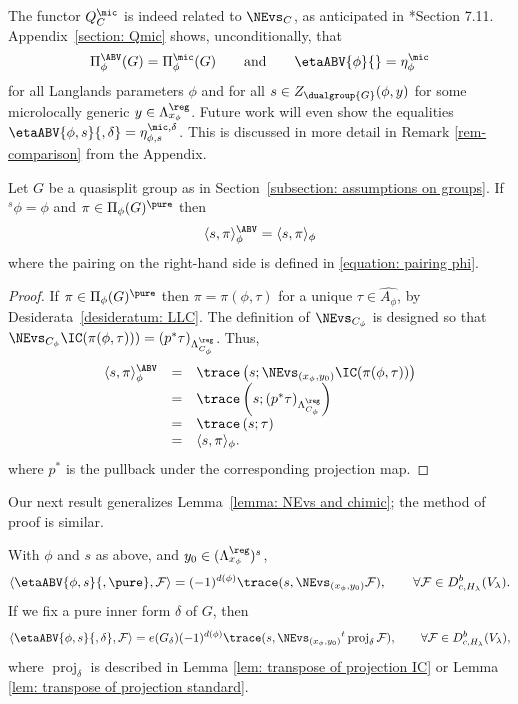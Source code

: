 \documentclass[11pt,letterpaper]{amsart}
\numberwithin{equation}{section}
\begin{document}
\begin{remark}\label{remark: trilinguality}
The functor $Q^\mic_C$ is indeed related to $\NEvs_C$, as anticipated in 
\cite{CFMMX22}*{Section 7.11}.
Appendix~\ref{section: Qmic} shows, unconditionally, that 
\[
\Pi^\ABV_\phi(G)
=
\Pi^\mic_\phi(G)
\qquad\textrm{and}\qquad
\etaABV{\phi}{}
=
\eta^\mic_{\phi}
\]
for all Langlands parameters $\phi$ and for all $s\in Z_{\dualgroup{G}}(\phi,y)$ for some microlocally generic $y\in \Lambda_{x_\phi}^\reg$.
Future work will even show the equalities $\etaABV{\phi,s}{,\delta} = \eta^{\mic,\delta}_{\phi,s}$.
This is discussed in more detail in Remark 
\ref{rem-comparison} from the Appendix.
\end{remark}



\begin{proposition}\label{prop L-packet inside ABV packet}
Let $G$ be a quasisplit group as in Section~\ref{subsection: assumptions on groups}.
    If  ${}^{s}\phi=\phi$ and $\pi \in \Pi_{\phi}(G)^\pure$ then 
    \[
    \langle {s},\pi\rangle_{\phi}^{\ABV} 
    = 
    \langle {s},\pi\rangle_{\phi}
    \]
    where the pairing on the right-hand side is defined in \eqref{equation: pairing phi}.
\end{proposition}

\begin{proof}
If $\pi \in \Pi_\phi(G)^\pure$ then $\pi=\pi(\phi,\tau)$ for a unique $\tau \in \widehat{A_\phi}$, by Desiderata~\ref{desideratum: LLC}.
The definition of $\NEvs_{C_\phi}$ is designed so that $\NEvs_{C_\phi} \IC(\pi(\phi,\tau))) = (p^*\tau)_{\Lambda^\reg_{C_\phi}}$.
Thus,
\[
\begin{array}{rcl}
\langle {s},\pi\rangle_{\phi}^{\ABV}
&=&
\trace\left({s}; \NEvs_{(x_\phi,y_0)}\IC(\pi(\phi,\tau))\right) \\
&=&
\trace\left({s};(p^*\tau)_{\Lambda^\reg_{C_\phi}} \right) \\
&=&
\trace\left({s};\tau\right) \\
&=& 
\langle {s},\pi\rangle_{\phi}. 
\end{array}
\]
where $p^*$ is the pullback under the corresponding projection map.
\end{proof}


Our next result generalizes Lemma~\ref{lemma: NEvs and chimic}; the method of proof is similar.

\begin{proposition}\label{proposition: etaABV,F}
With $\phi$ and $s$ as above, and $y_0\in (\Lambda^\reg_{x_\phi})^s$, 
\[
\langle
\etaABV{\phi,s}{,\pure}, \mathcal{F}
\rangle
=
(-1)^{d(\phi)}
\trace({s},\NEvs_{(x_\phi,y_0)} \mathcal{F}),
\qquad \forall \mathcal{F}\in  D^b_{c,H_\lambda}(V_\lambda).
\]
If we fix a pure inner form $\delta$ of $G$, then
\[
\langle
\etaABV{\phi,s}{,\delta}, \mathcal{F}
\rangle
=e(G_{\delta})
(-1)^{d(\phi)}
\trace({s},\NEvs_{(x_\phi,y_0)} {}^t \operatorname{proj}_{\delta}\mathcal{F}),
\qquad \forall \mathcal{F}\in  D^b_{c,H_\lambda}(V_\lambda),
\]
where $\operatorname{proj}_{\delta}$ is described in Lemma \ref{lem: transpose of projection IC} or Lemma \ref{lem: transpose of projection standard}.
\end{proposition}
\end{document}
